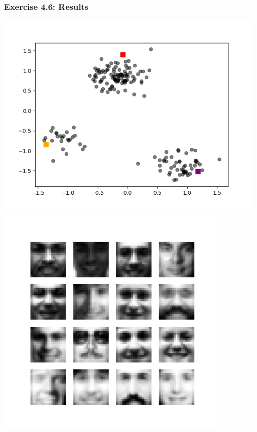 \documentclass[10pt,aspectratio=169,handout]{beamer}
\begin{document}
\begin{frame}
    \frametitle{Exercise 4.6: Results}

    \begin{minipage}{0.49\textwidth}
        \includegraphics[width=\textwidth]{images/blob_4_6.png}
    \end{minipage}
    \begin{minipage}{0.49\textwidth}
        \includegraphics[width=0.85\textwidth]{images/faces_4_6.png}
    \end{minipage}
   

\end{frame}
\end{document}
